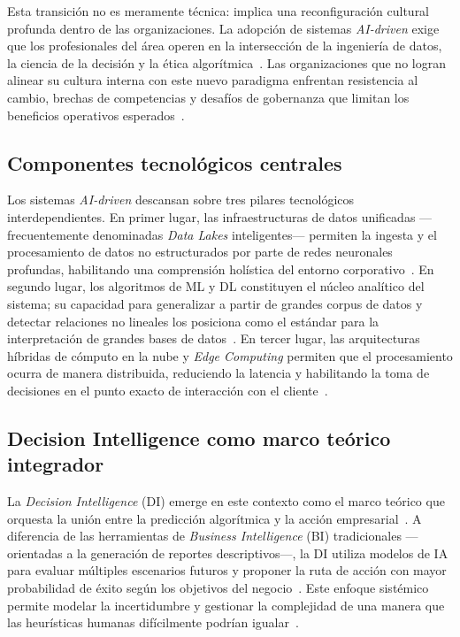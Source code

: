 \documentclass[conference]{IEEEtran}
\begin{document}
Esta transición no es meramente técnica: implica una reconfiguración
cultural profunda dentro de las organizaciones. La adopción de sistemas
\textit{AI-driven} exige que los profesionales del área operen en la
intersección de la ingeniería de datos, la ciencia de la decisión y la
ética algorítmica~\cite{murire2024}. Las organizaciones que no
logran alinear su cultura interna con este nuevo paradigma enfrentan
resistencia al cambio, brechas de competencias y desafíos de gobernanza
que limitan los beneficios operativos esperados~\cite{murire2024}.
 
\subsection{Componentes tecnológicos centrales}
 
Los sistemas \textit{AI-driven} descansan sobre tres pilares
tecnológicos interdependientes. En primer lugar, las infraestructuras de
datos unificadas —frecuentemente denominadas \textit{Data Lakes}
inteligentes— permiten la ingesta y el procesamiento de datos no
estructurados por parte de redes neuronales profundas, habilitando una
comprensión holística del entorno corporativo~\cite{seth2025}. En segundo
lugar, los algoritmos de ML y DL constituyen el núcleo analítico del
sistema; su capacidad para generalizar a partir de grandes corpus de
datos y detectar relaciones no lineales los posiciona como el estándar
para la interpretación de grandes bases de
datos~\cite{janiesch2021ml,natta2025}. En tercer lugar, las arquitecturas
híbridas de cómputo en la nube y \textit{Edge Computing} permiten que el
procesamiento ocurra de manera distribuida, reduciendo la latencia y
habilitando la toma de decisiones en el punto exacto de interacción con
el cliente~\cite{seth2025}.
 
\subsection{Decision Intelligence como marco teórico integrador}
 
La \textit{Decision Intelligence} (DI) emerge en este contexto como el
marco teórico que orquesta la unión entre la predicción algorítmica y la
acción empresarial~\cite{heilig2024}. A diferencia de las herramientas
de \textit{Business Intelligence} (BI) tradicionales —orientadas a la
generación de reportes descriptivos—, la DI utiliza modelos de IA para
evaluar múltiples escenarios futuros y proponer la ruta de acción con
mayor probabilidad de éxito según los objetivos del
negocio~\cite{heilig2024,jeyanthi2022}. Este enfoque sistémico permite
modelar la incertidumbre y gestionar la complejidad de una manera que las
heurísticas humanas difícilmente podrían igualar~\cite{tasleem2024}.
 
\end{document}
